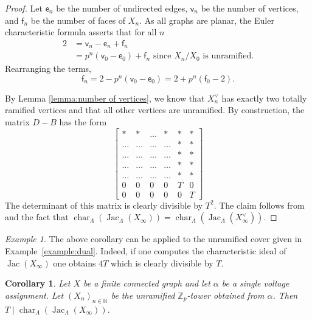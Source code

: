 \documentclass{amsart}
\newtheorem{corollary}[theorem]{Corollary}
\numberwithin{equation}{section}
\theoremstyle{remark}
\newtheorem{example}[theorem]{Example}
\newcommand{\Jac}{\operatorname{Jac}}
\newcommand{\Char}{\operatorname{char}}
\newcommand{\Z}{\mathbb{Z}}
\theoremstyle{plain} %
\begin{document}
\begin{proof}
Let $\mathsf{e}_n$ be the number of undirected edges, $\mathsf{v}_n$ be the number of vertices, and $\mathsf{f}_n$ be the number of faces of $X_n$.
As all graphs are planar, the Euler characteristic formula asserts that for all $n$
\begin{align*}
2 & = \mathsf{v}_n - \mathsf{e}_n + \mathsf{f}_n\\
& = p^n(\mathsf{v}_0-\mathsf{e}_0)+\mathsf{f}_n \textrm{ since } X_n/X_0 \textrm{ is unramified.}
\end{align*}
Rearranging the terms,
\[
\mathsf{f}_n = 2 - p^n(\mathsf{v}_0 - \mathsf{e}_0) = 2 + p^n(\mathsf{f}_0-2).
\]
    
By Lemma \ref{lemma:number of vertices}, we know that $X_n^\vee$ has exactly two totally ramified vertices and that all other vertices are unramified.
By construction, the matrix $D-B$ has the form
\[\begin{bmatrix}
    *&*&\dots &*&*&*\\
    \dots&\dots&\dots &\dots &*&*\\
    \dots&\dots&\dots &\dots &*&*\\
    \dots&\dots&\dots &\dots &*&*\\
    \dots&\dots&\dots &\dots &*&*\\
    0&0&0&0&T&0\\
    0&0&0&0&0&T
\end{bmatrix}\]
The determinant of this matrix is clearly divisible by $T^2$. 
The claim follows from \cite[Theorem~5.9]{GV24} and the fact that ${\Char}_{\Lambda}(\Jac_{\Lambda}(X_\infty)) = {\Char}_{\Lambda}(\Jac_{\Lambda}(X_\infty^\vee))$. 
\end{proof}

\begin{example}
The above corollary can be applied to the unramified cover given in Example~\ref{example:dual}.
Indeed, if one computes the characteristic ideal of $\Jac(X_\infty)$ one obtains $4T$ which is clearly divisible by $T$. 
\end{example}


\begin{corollary}
{Let $X$ be a finite connected graph and let $\alpha$ be a single voltage assignment.
Let $(X_n)_{n\in \mathbb{N}}$ be the unramified $\Z_p$-tower obtained from $\alpha$.
Then $T\mid \Char_\Lambda(\Jac_\Lambda(X_\infty))$.}
\end{corollary}
\end{document}
